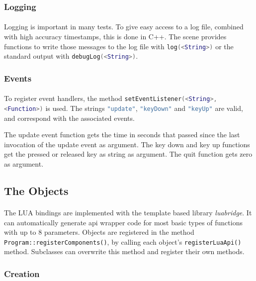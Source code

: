 \subsubsection{Logging}
\paragraph{}
Logging is important in many tests. To give easy access to a log file, combined with high accuracy timestamps, this is done in C++.
The scene provides functions to write those messages to the log file with \lstinline[language=lua]{log(<String>)} or the standard output with \lstinline[language=lua]{debugLog(<String>)}.

\subsubsection{Events}
\paragraph{}
To register event handlers, the method \lstinline[language=lua]{setEventListener(<String>, <Function>)} is used.
The strings \lstinline[language=lua]{"update"}, \lstinline[language=lua]{"keyDown"} and \lstinline[language=lua]{"keyUp"} are valid, and correspond with the associated events.

The update event function gets the time in seconds that passed since the last invocation of the update event as argument.
The key down and key up functions get the pressed or released key as string as argument.
The quit function gets zero as argument.

\subsection{The Objects}
\paragraph{}
The LUA bindings are implemented with the template based library \textit{luabridge}\cite{lb}.
It can automatically generate api wrapper code for most basic types of functions with up to 8 parameters.
Objects are registered in the method \lstinline{Program::registerComponents()},
by calling each object's \lstinline{registerLuaApi()} method.
Subclasses can overwrite this method and register their own methods.

\subsubsection{Creation}
